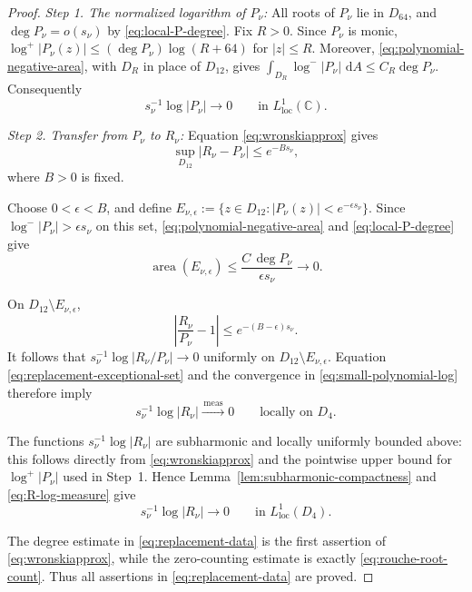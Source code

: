 \documentclass[12pt,letterpaper,reqno]{amsart}
\theoremstyle{definition}
\numberwithin{equation}{section}
\newcommand{\C}{\mathbb C}
\newcommand{\dA}{\,\mathrm dA}
\newcommand{\loc}{\mathrm{loc}}
\newcommand{\convmeas}{\xrightarrow{\,\mathrm{meas}\,}}
\DeclareMathOperator{\meas}{area}
\begin{document}
\begin{proof}

\medskip\noindent
\emph{{Step 1. The normalized logarithm of \(P_\nu\):}}
All roots of \(P_\nu\) lie in \(D_{64}\), and
\(\deg P_\nu=o(s_\nu)\) by \eqref{eq:local-P-degree}.
Fix \(R>0\). Since \(P_\nu\) is monic,
\(\log^+|P_\nu(z)|
 \leq(\deg P_\nu)\log(R+64)\)
for \(|z|\leq R\). Moreover,
\eqref{eq:polynomial-negative-area}, with \(D_R\) in place of
\(D_{12}\), gives
\(\int_{D_R}\log^-|P_\nu|\,\dA
 \leq C_R\deg P_\nu\).
Consequently
\begin{equation}\label{eq:small-polynomial-log}
 s_\nu^{-1}\log|P_\nu|
 \longrightarrow0
 \qquad\text{in }L^1_{\loc}(\C).
\end{equation}


\medskip\noindent
\emph{{Step 2. Transfer from \(P_\nu\) to \(R_\nu\):}}
Equation \eqref{eq:wronskiapprox} gives
\[
 \sup_{D_{12}}|R_\nu-P_\nu|
 \leq e^{-Bs_\nu},
\]
where \(B>0\) is fixed.

Choose \(0<\epsilon<B\), and define
\(E_{\nu,\epsilon}
 :=\{z\in D_{12}:|P_\nu(z)|<e^{-\epsilon s_\nu}\}\).
Since
\(\log^-|P_\nu|>\epsilon s_\nu\) on this set,
\eqref{eq:polynomial-negative-area} and
\eqref{eq:local-P-degree} give
\begin{equation}\label{eq:replacement-exceptional-set}
 \meas(E_{\nu,\epsilon})
 \leq
 \frac{C\,\deg P_\nu}{\epsilon s_\nu}
 \longrightarrow0.
\end{equation}

On \(D_{12}\setminus E_{\nu,\epsilon}\),
\[
 \left|\frac{R_\nu}{P_\nu}-1\right|
 \leq
 e^{-(B-\epsilon)s_\nu}.
\]
It follows that
\(s_\nu^{-1}\log|R_\nu/P_\nu|\to0\) uniformly on
\(D_{12}\setminus E_{\nu,\epsilon}\). Equation
\eqref{eq:replacement-exceptional-set} and the convergence in
\eqref{eq:small-polynomial-log} therefore imply
\begin{equation}\label{eq:R-log-measure}
 s_\nu^{-1}\log|R_\nu|
 \convmeas0
 \qquad\text{locally on }D_4.
\end{equation}

The functions \(s_\nu^{-1}\log|R_\nu|\) are subharmonic and locally
uniformly bounded above: this follows directly from
\eqref{eq:wronskiapprox} and the pointwise upper bound for
\(\log^+|P_\nu|\) used in Step~1. Hence
Lemma~\ref{lem:subharmonic-compactness} and
\eqref{eq:R-log-measure} give
\[
 s_\nu^{-1}\log|R_\nu|
 \longrightarrow0
 \qquad\text{in }L^1_{\loc}(D_4).
\]

The degree estimate in \eqref{eq:replacement-data} is the first
assertion of \eqref{eq:wronskiapprox}, while the zero-counting estimate
is exactly \eqref{eq:rouche-root-count}. Thus all assertions in
\eqref{eq:replacement-data} are proved.


\end{proof}
\end{document}
